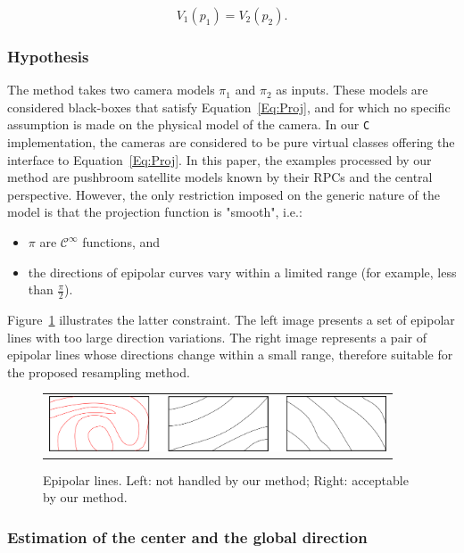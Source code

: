 \documentclass{ipol}
\newcommand{\CPP}{\mbox{\tt C\hspace{-0.05cm}\raisebox{0.2ex}{\small ++} }}
\begin{document}
\begin{equation}
    V_1(p_1) = V_2(p_2) \label{EqV1V2}.
\end{equation}

\subsubsection{Hypothesis}


The method takes two camera models $\pi_1$ and $\pi_2$ as inputs.
These models are considered black-boxes that satisfy Equation~\eqref{Eq:Proj}, and for which no specific assumption is made on the physical model of the camera. In our \CPP implementation,
the cameras are considered to be pure virtual classes offering the interface to Equation~\eqref{Eq:Proj}.
In this paper, the examples processed by our method are pushbroom satellite models known by their RPCs and the central perspective. However, the only restriction imposed on the generic nature of the model is that the projection function is "smooth", i.e.:

\begin{itemize}
    \item $\pi$ are $\mathcal{C}^{\infty}$ functions, and
    \item the directions of epipolar curves vary within a limited range (for example,
          less than $\frac{\pi}{2}$).
\end{itemize}
%
Figure~\ref{BadGoodEpip} illustrates the latter constraint. The left image presents a set
of epipolar lines with too large direction variations. The right image represents a pair of epipolar lines whose directions change within a small range, therefore suitable for the proposed resampling method. 
%
\begin{figure}[h!]
\centering
\begin{tabular}{c}
\includegraphics[width=10cm]{FIGS/BadGoodLines.png}
\end{tabular}
\caption{Epipolar lines. Left: not handled by our method; Right: acceptable by our method.}
\label{BadGoodEpip}
\end{figure}


\subsubsection{Estimation of the center and the global direction}
\end{document}
